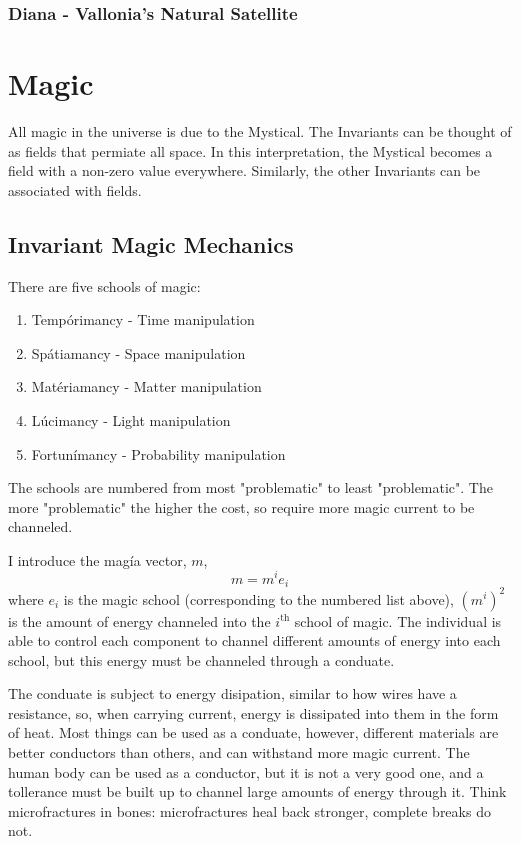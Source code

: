 \documentclass[
a4paper,
10pt,
twoside,
]{article}
\begin{document}
\subsubsection{Diana - Vallonia's Natural Satellite}

\section{Magic}

All magic in the universe is due to the Mystical.
The Invariants can be thought of as fields that permiate all space.
In this interpretation, the Mystical becomes a field with a non-zero value everywhere.
Similarly, the other Invariants can be associated with fields.

\subsection{Invariant Magic Mechanics}

There are five schools of magic:
\begin{enumerate}
	\item Tempórimancy - Time manipulation
	\item Spátiamancy - Space manipulation
	\item Matériamancy - Matter manipulation
	\item Lúcimancy - Light manipulation
	\item Fortunímancy - Probability manipulation
\end{enumerate}

The schools are numbered from most "problematic" to least "problematic".
The more "problematic" the higher the cost, so require more magic current to be channeled.

I introduce the magía vector, $m$,
\begin{equation}
	m = m^i e_i
	\label{eq : magic vector}
\end{equation}
where $e_i$ is the magic school (corresponding to the numbered list above), $(m^i)^2$ is the amount of energy channeled into the $i^{\text{th}}$ school of magic.
The individual is able to control each component to channel different amounts of energy into each school, but this energy must be channeled through a conduate.

The conduate is subject to energy disipation, similar to how wires have a resistance, so, when carrying current, energy is dissipated into them in the form of heat.
Most things can be used as a conduate, however, different materials are better conductors than others, and can withstand more magic current.
The human body can be used as a conductor, but it is not a very good one, and a tollerance must be built up to channel large amounts of energy through it.
Think microfractures in bones: microfractures heal back stronger, complete breaks do not.
\end{document}
